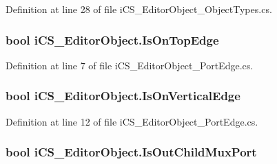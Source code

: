 Definition at line 28 of file i\+C\+S\+\_\+\+Editor\+Object\+\_\+\+Object\+Types.\+cs.

\hypertarget{classi_c_s___editor_object_a1fb75fa9bd427a1c7b5b598ddacd859e}{
\subsubsection[{Is\+On\+Top\+Edge}]{\setlength{\rightskip}{0pt plus 5cm}bool i\+C\+S\+\_\+\+Editor\+Object.\+Is\+On\+Top\+Edge\hspace{0.3cm}{\ttfamily [get]}}}\label{classi_c_s___editor_object_a1fb75fa9bd427a1c7b5b598ddacd859e}


Definition at line 7 of file i\+C\+S\+\_\+\+Editor\+Object\+\_\+\+Port\+Edge.\+cs.

\hypertarget{classi_c_s___editor_object_a295d7285f95b0e2373ef4db3e886dcd1}{
\subsubsection[{Is\+On\+Vertical\+Edge}]{\setlength{\rightskip}{0pt plus 5cm}bool i\+C\+S\+\_\+\+Editor\+Object.\+Is\+On\+Vertical\+Edge\hspace{0.3cm}{\ttfamily [get]}}}\label{classi_c_s___editor_object_a295d7285f95b0e2373ef4db3e886dcd1}


Definition at line 12 of file i\+C\+S\+\_\+\+Editor\+Object\+\_\+\+Port\+Edge.\+cs.

\hypertarget{classi_c_s___editor_object_ac5ee4608221189ee1d6eb35ca37ab734}{
\subsubsection[{Is\+Out\+Child\+Mux\+Port}]{\setlength{\rightskip}{0pt plus 5cm}bool i\+C\+S\+\_\+\+Editor\+Object.\+Is\+Out\+Child\+Mux\+Port\hspace{0.3cm}{\ttfamily [get]}}}\label{classi_c_s___editor_object_ac5ee4608221189ee1d6eb35ca37ab734}


